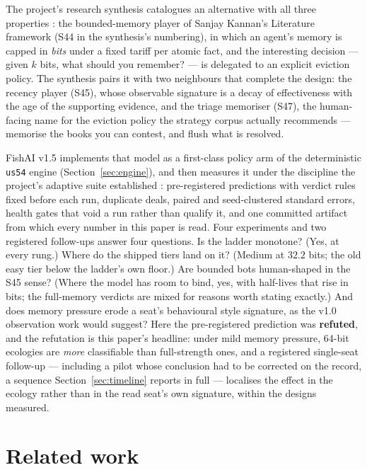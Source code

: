 \documentclass[11pt]{article}
\newcommand{\code}[1]{\texttt{#1}}
\newcommand{\usff}{\code{us54}}
\begin{document}
The project's research synthesis catalogues an alternative with all three properties
\cite{playstyles}: the bounded-memory player of Sanjay Kannan's Literature framework
(S44 in the synthesis's numbering), in which an agent's memory is capped in
\emph{bits} under a fixed tariff per atomic fact, and the interesting decision --- given
$k$ bits, what should you remember? --- is delegated to an explicit eviction policy. The
synthesis pairs it with two neighbours that complete the design: the recency player
(S45), whose observable signature is a decay of effectiveness with the age of the
supporting evidence, and the triage memoriser (S47), the human-facing name for the
eviction policy the strategy corpus actually recommends --- memorise the books you can
contest, and flush what is resolved.

FishAI v1.5 implements that model as a first-class policy arm of the deterministic
\usff{} engine (Section~\ref{sec:engine}), and then measures it under the discipline the
project's adaptive suite established \cite{v10paper}: pre-registered predictions with
verdict rules fixed before each run, duplicate deals, paired and seed-clustered standard
errors, health gates that void a run rather than qualify it, and one committed artifact
\cite{artifact} from which every number in this paper is read. Four experiments and two
registered follow-ups answer four questions. Is the ladder monotone? (Yes, at every
rung.) Where do the shipped tiers land on it? (Medium at $32.2$ bits; the old easy tier
below the ladder's own floor.) Are bounded bots human-shaped in the S45 sense? (Where
the model has room to bind, yes, with half-lives that rise in bits; the full-memory
verdicts are mixed for reasons worth stating exactly.) And does memory pressure erode a
seat's behavioural style signature, as the v1.0 observation work \cite{obspaper} would
suggest? Here the pre-registered prediction was \textbf{refuted}, and the refutation is
this paper's headline: under mild memory pressure, 64-bit ecologies are \emph{more}
classifiable than full-strength ones, and a registered single-seat follow-up ---
including a pilot whose conclusion had to be corrected on the record, a sequence
Section~\ref{sec:timeline} reports in full --- localises the effect in the ecology
rather than in the read seat's own signature, within the designs measured.

\section{Related work}
\label{sec:related}
\end{document}
